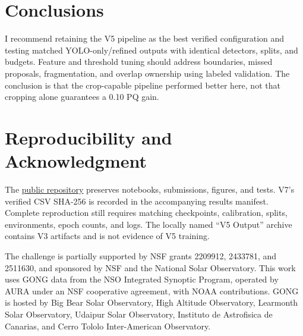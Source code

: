\documentclass[sigconf]{acmart}
\begin{document}
\section{Conclusions}
I recommend retaining the V5 pipeline as the best verified configuration
and testing matched YOLO-only/refined outputs with identical detectors,
splits, and budgets. Feature and threshold tuning should address boundaries,
missed proposals, fragmentation, and overlap ownership using labeled
validation. The conclusion is that the crop-capable pipeline performed
better here, not that cropping alone guarantees a 0.10 PQ gain.

\section{Reproducibility and Acknowledgment}
The \href{https://github.com/Greg-Kojadinovich/solar-filament-segmentation-2026}{public repository}
preserves notebooks, submissions, figures, and tests. V7's verified CSV
SHA-256 is recorded in the accompanying results manifest. Complete
reproduction still requires matching checkpoints, calibration, splits,
environments, epoch counts, and logs. The locally named ``V5 Output''
archive contains V3 artifacts and is not evidence of V5 training.

The challenge is partially supported by NSF grants 2209912, 2433781,
and 2511630, and sponsored by NSF and the National Solar Observatory.
This work uses GONG data from the NSO Integrated Synoptic Program,
operated by AURA under an NSF cooperative agreement, with NOAA
contributions. GONG is hosted by Big Bear Solar Observatory, High Altitude
Observatory, Learmonth Solar Observatory, Udaipur Solar Observatory,
Instituto de Astrofisica de Canarias, and Cerro Tololo Inter-American
Observatory.



\end{document}

